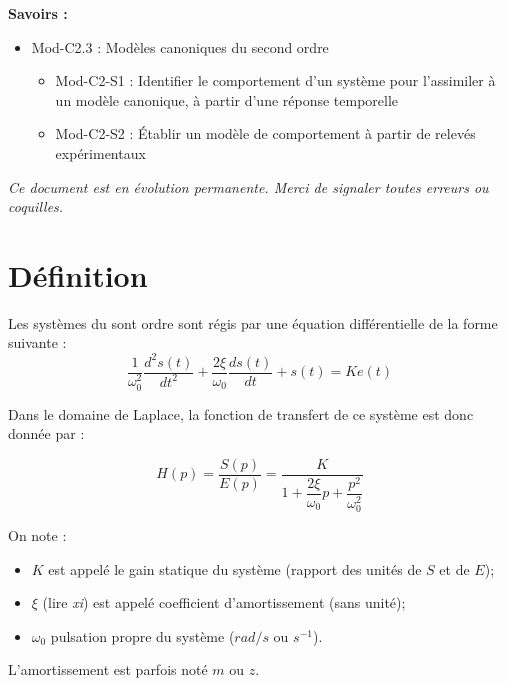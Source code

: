 \documentclass[10pt]{article}
\begin{document}
\begin{savoir}
\textbf{Savoirs :}
\begin{itemize}
\item Mod-C2.3 : Modèles canoniques du second ordre
\begin{itemize}
\item Mod-C2-S1 : Identifier le comportement d’un système pour l’assimiler à un modèle canonique, à partir d’une réponse temporelle 
\item Mod-C2-S2 : Établir un modèle de comportement à partir de relevés expérimentaux
\end{itemize}
\end{itemize}
\end{savoir}

\setlength{\parskip}{0ex plus 0.2ex minus 0ex}
 \renewcommand{\contentsname}{}
 \renewcommand{\baselinestretch}{1}

\textit{Ce document est en évolution permanente. Merci de signaler toutes
erreurs ou coquilles.}

\tableofcontents

 \renewcommand{\baselinestretch}{1.2}
\setlength{\parskip}{2ex plus 0.5ex minus 0.2ex}



\section{Définition}


Les systèmes du sont ordre sont régis par une équation différentielle de la
forme suivante :
$$
\dfrac{1}{\omega_0^2} \dfrac{d^2 s(t)}{dt^2}+\dfrac{2\xi}{\omega_0} \dfrac{d s(t)}{dt}+s(t) = Ke(t)
$$



\begin{defi}
Dans le domaine de Laplace, la fonction de transfert de ce système est donc
donnée par :

$$
H(p) 
= \dfrac{S(p)}{E(p)} 
= \dfrac{K}{1+ \dfrac{2\xi}{\omega_0}p+\dfrac{p^2}{\omega_0^2}}
$$

On note :
\begin{itemize}
\item $K$ est appelé le gain statique du système (rapport des unités de $S$ et de $E$);
\item $\xi$ (lire \textit{xi}) est appelé coefficient d'amortissement (sans unité);
\item $\omega_0$ pulsation propre du système ($rad/s$ ou $s^{-1}$).
\end{itemize}

\end{defi}
L'amortissement est parfois noté $m$ ou $z$.
\end{document}
